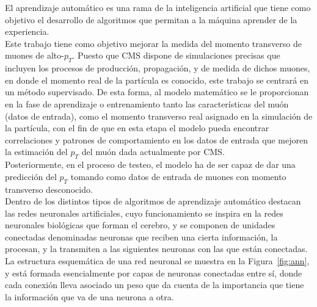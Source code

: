 El aprendizaje autom\'atico es una rama de la inteligencia artificial que tiene como objetivo el desarrollo de algoritmos que permitan a la m\'aquina aprender de la experiencia. \\

Este trabajo tiene como objetivo mejorar la medida del momento transverso de muones de alto-$p_{T}$. Puesto que CMS dispone de simulaciones precisas que incluyen los procesos de producci\'on, propagaci\'on, y de medida de dichos muones, en donde el momento real de la part\'icula es conocido, este trabajo se centrar\'a en un m\'etodo supervisado. De esta forma, al modelo matem\'atico se le proporcionan en la fase de aprendizaje o entrenamiento tanto las caracter\'isticas del mu\'on (datos de entrada), como el momento transverso real asignado en la simulaci\'on de la part\'icula, con el fin de que en esta etapa el modelo pueda encontrar correlaciones y patrones de comportamiento en los datos de entrada que mejoren la estimaci\'on del $p_{T}$ del mu\'on dada actualmente por CMS. \\
Posteriormente, en el proceso de testeo, el modelo ha de ser capaz de dar una predicci\'on del $p_{T}$ tomando como datos de entrada de muones con momento transverso desconocido. \\

Dentro de los distintos tipos de algoritmos de aprendizaje autom\'atico destacan las redes neuronales artificiales, cuyo funcionamiento se inspira en la redes neuronales biol\'ogicas que forman el cerebro, y se componen de unidades conectadas denominadas neuronas que reciben una cierta informaci\'on, la procesan, y la transmiten a las siguientes neuronas con las que est\'an conectadas. La estructura esquem\'atica de una red neuronal se muestra en la Figura~\ref{fig:ann}, y est\'a formada esencialmente por capas de neuronas conectadas entre s\'i, donde cada conexi\'on lleva asociado un peso que da cuenta de la importancia que tiene la informaci\'on que va de una neurona a otra. \\

